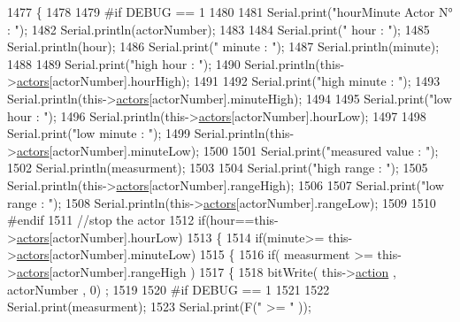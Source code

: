 \begin{DoxyCode}
1477 \{
1478 
1479 \textcolor{preprocessor}{#if DEBUG == 1}
1480     
1481     Serial.print(\textcolor{stringliteral}{"hourMinute Actor N° : "});
1482     Serial.println(actorNumber);
1483 
1484     Serial.print(\textcolor{stringliteral}{" hour : "});
1485     Serial.println(hour);
1486     Serial.print(\textcolor{stringliteral}{" minute : "});
1487     Serial.println(minute);
1488 
1489     Serial.print(\textcolor{stringliteral}{"high hour : "});
1490     Serial.println(this->\hyperlink{class_jetpack_a7e16d2f97837f9712a2e6de1c50d99db}{actors}[actorNumber].hourHigh);
1491 
1492     Serial.print(\textcolor{stringliteral}{"high minute : "});
1493     Serial.println(this->\hyperlink{class_jetpack_a7e16d2f97837f9712a2e6de1c50d99db}{actors}[actorNumber].minuteHigh);
1494 
1495     Serial.print(\textcolor{stringliteral}{"low hour : "});
1496     Serial.println(this->\hyperlink{class_jetpack_a7e16d2f97837f9712a2e6de1c50d99db}{actors}[actorNumber].hourLow);
1497 
1498     Serial.print(\textcolor{stringliteral}{"low minute : "});
1499     Serial.println(this->\hyperlink{class_jetpack_a7e16d2f97837f9712a2e6de1c50d99db}{actors}[actorNumber].minuteLow);
1500 
1501     Serial.print(\textcolor{stringliteral}{"measured value : "});
1502     Serial.println(measurment);
1503 
1504     Serial.print(\textcolor{stringliteral}{"high range : "});
1505     Serial.println(this->\hyperlink{class_jetpack_a7e16d2f97837f9712a2e6de1c50d99db}{actors}[actorNumber].rangeHigh);
1506 
1507     Serial.print(\textcolor{stringliteral}{"low range : "});
1508     Serial.println(this->\hyperlink{class_jetpack_a7e16d2f97837f9712a2e6de1c50d99db}{actors}[actorNumber].rangeLow);
1509 
1510 \textcolor{preprocessor}{#endif}
1511     \textcolor{comment}{//stop the actor}
1512     \textcolor{keywordflow}{if}(hour==this->\hyperlink{class_jetpack_a7e16d2f97837f9712a2e6de1c50d99db}{actors}[actorNumber].hourLow)
1513     \{
1514         \textcolor{keywordflow}{if}(minute>= this->\hyperlink{class_jetpack_a7e16d2f97837f9712a2e6de1c50d99db}{actors}[actorNumber].minuteLow)
1515         \{
1516             \textcolor{keywordflow}{if}( measurment >= this->\hyperlink{class_jetpack_a7e16d2f97837f9712a2e6de1c50d99db}{actors}[actorNumber].rangeHigh )
1517             \{
1518                 bitWrite( this->\hyperlink{class_jetpack_aca3142925a7b0834b34ae91d26af7765}{action} , actorNumber , 0) ;
1519 
1520 \textcolor{preprocessor}{            #if DEBUG == 1 }
1521 
1522                 Serial.print(measurment);
1523                 Serial.print(F(\textcolor{stringliteral}{" >= "} ));

\end{DoxyCode}
